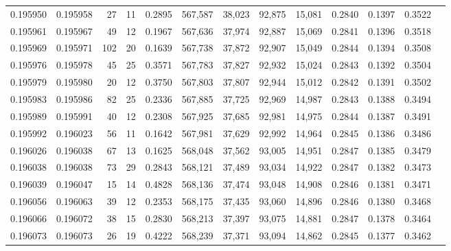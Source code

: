 \begin{tabular}{rrrrrrrrrrrrr}
0.195950 & 0.195958 &    27 &  11 &                                     0.2895 & 567,587 &  38,023 &  92,875 &  15,081 & 0.2840 & 0.1397 & 0.3522 \\
0.195961 & 0.195967 &    49 &  12 &                                     0.1967 & 567,636 &  37,974 &  92,887 &  15,069 & 0.2841 & 0.1396 & 0.3518 \\
0.195969 & 0.195971 &   102 &  20 &                                     0.1639 & 567,738 &  37,872 &  92,907 &  15,049 & 0.2844 & 0.1394 & 0.3508 \\
0.195976 & 0.195978 &    45 &  25 &                                     0.3571 & 567,783 &  37,827 &  92,932 &  15,024 & 0.2843 & 0.1392 & 0.3504 \\
0.195979 & 0.195980 &    20 &  12 &                                     0.3750 & 567,803 &  37,807 &  92,944 &  15,012 & 0.2842 & 0.1391 & 0.3502 \\
0.195983 & 0.195986 &    82 &  25 &                                     0.2336 & 567,885 &  37,725 &  92,969 &  14,987 & 0.2843 & 0.1388 & 0.3494 \\
0.195989 & 0.195991 &    40 &  12 &                                     0.2308 & 567,925 &  37,685 &  92,981 &  14,975 & 0.2844 & 0.1387 & 0.3491 \\
0.195992 & 0.196023 &    56 &  11 &                                     0.1642 & 567,981 &  37,629 &  92,992 &  14,964 & 0.2845 & 0.1386 & 0.3486 \\
0.196026 & 0.196038 &    67 &  13 &                                     0.1625 & 568,048 &  37,562 &  93,005 &  14,951 & 0.2847 & 0.1385 & 0.3479 \\
0.196038 & 0.196038 &    73 &  29 &                                     0.2843 & 568,121 &  37,489 &  93,034 &  14,922 & 0.2847 & 0.1382 & 0.3473 \\
0.196039 & 0.196047 &    15 &  14 &                                     0.4828 & 568,136 &  37,474 &  93,048 &  14,908 & 0.2846 & 0.1381 & 0.3471 \\
0.196056 & 0.196063 &    39 &  12 &                                     0.2353 & 568,175 &  37,435 &  93,060 &  14,896 & 0.2846 & 0.1380 & 0.3468 \\
0.196066 & 0.196072 &    38 &  15 &                                     0.2830 & 568,213 &  37,397 &  93,075 &  14,881 & 0.2847 & 0.1378 & 0.3464 \\
0.196073 & 0.196073 &    26 &  19 &                                     0.4222 & 568,239 &  37,371 &  93,094 &  14,862 & 0.2845 & 0.1377 & 0.3462 \\

\end{tabular}
